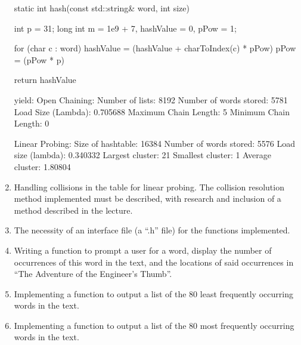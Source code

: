 \documentclass[12pt]{article}
\begin{document}
\begin{enumerate}
static int hash(const std::string& word, int size) {
    int p = 31;
    long int m = 1e9 + 7, hashValue = 0, pPow = 1;

    for (char c : word) {
        hashValue = (hashValue + charToIndex(c) * pPow) %
        pPow = (pPow * p) %
    }

    return hashValue %
}

yield:
Open Chaining:
Number of lists: 8192
Number of words stored: 5781
Load Size (Lambda): 0.705688
Maximum Chain Length: 5
Minimum Chain Length: 0

Linear Probing:
Size of hashtable: 16384
Number of words stored: 5576
Load size (lambda): 0.340332
Largest cluster: 21
Smallest cluster: 1
Average cluster: 1.80804



\item
Handling collisions in the table for linear probing. The collision resolution method implemented must be
described, with research and inclusion of a method described in the lecture.

\item
The necessity of an interface file (a “.h” file) for the functions implemented.

\item
Writing a function to prompt a user for a word, display the number of occurrences of this word in the
text, and the locations of said occurrences in “The Adventure of the Engineer’s Thumb”.

\item
Implementing a function to output a list of the 80 least frequently occurring words in the text.

\item
Implementing a function to output a list of the 80 most frequently occurring words in the text.
\end{enumerate}
\end{document}
